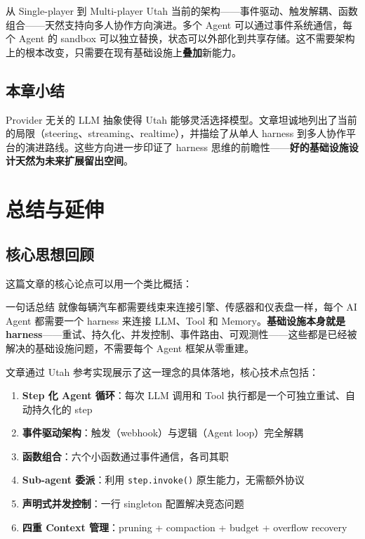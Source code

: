 \documentclass[a4paper]{article}
\begin{document}
\begin{knowledgebox}{从 Single-player 到 Multi-player}
Utah 当前的架构——事件驱动、触发解耦、函数组合——天然支持向多人协作方向演进。多个 Agent 可以通过事件系统通信，每个 Agent 的 sandbox 可以独立替换，状态可以外部化到共享存储。这不需要架构上的根本改变，只需要在现有基础设施上\textbf{叠加}新能力。
\end{knowledgebox}

\subsection{本章小结}

Provider 无关的 LLM 抽象使得 Utah 能够灵活选择模型。文章坦诚地列出了当前的局限（steering、streaming、realtime），并描绘了从单人 harness 到多人协作平台的演进路线。这些方向进一步印证了 harness 思维的前瞻性——\textbf{好的基础设施设计天然为未来扩展留出空间}。


\section{总结与延伸}

\subsection{核心思想回顾}

这篇文章的核心论点可以用一个类比概括：

\begin{importantbox}{一句话总结}
就像每辆汽车都需要线束来连接引擎、传感器和仪表盘一样，每个 AI Agent 都需要一个 harness 来连接 LLM、Tool 和 Memory。\textbf{基础设施本身就是 harness}——重试、持久化、并发控制、事件路由、可观测性——这些都是已经被解决的基础设施问题，不需要每个 Agent 框架从零重建。
\end{importantbox}

文章通过 Utah 参考实现展示了这一理念的具体落地，核心技术点包括：

\begin{enumerate}
    \item \textbf{Step 化 Agent 循环}：每次 LLM 调用和 Tool 执行都是一个可独立重试、自动持久化的 step
    \item \textbf{事件驱动架构}：触发（webhook）与逻辑（Agent loop）完全解耦
    \item \textbf{函数组合}：六个小函数通过事件通信，各司其职
    \item \textbf{Sub-agent 委派}：利用 \texttt{step.invoke()} 原生能力，无需额外协议
    \item \textbf{声明式并发控制}：一行 singleton 配置解决竞态问题
    \item \textbf{四重 Context 管理}：pruning + compaction + budget + overflow recovery
\end{enumerate}
\end{document}
